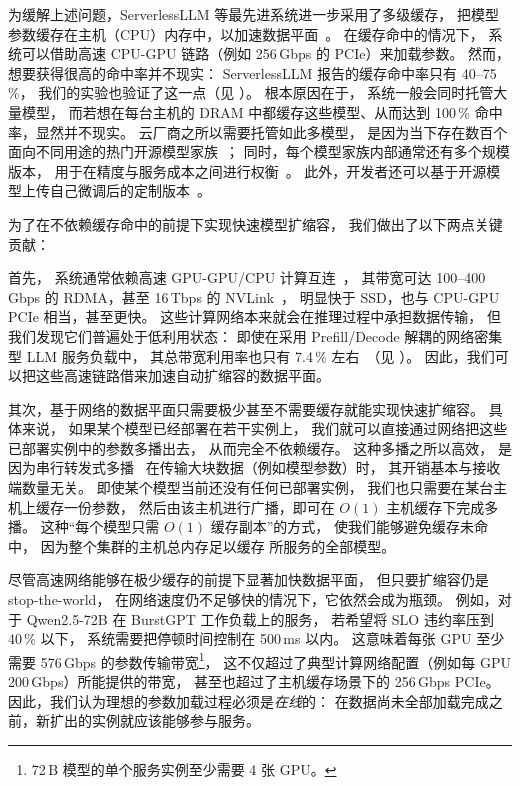 为缓解上述问题，ServerlessLLM 等最先进系统进一步采用了多级缓存，
把模型参数缓存在主机（CPU）内存中，以加速数据平面~\cite{DBLP:conf/osdi/GujaratiKAHKVM20,DBLP:conf/eurosys/JeongBA23}。
在缓存命中的情况下，
系统可以借助高速 CPU-GPU 链路（例如 256\,Gbps 的 PCIe）来加载参数。
然而，想要获得很高的命中率并不现实：
ServerlessLLM 报告的缓存命中率只有 40--75\,\%，
我们的实验也验证了这一点（见 \textsection{\ref{sec:bg-motiv}}）。
根本原因在于，{\maas} 系统一般会同时托管大量模型，
而若想在每台主机的 DRAM 中都缓存这些模型、从而达到 100\,\% 命中率，显然并不现实。
云厂商之所以需要托管如此多模型，
是因为当下存在数百个面向不同用途的热门开源模型家族~\cite{huggingface}；
同时，每个模型家族内部通常还有多个规模版本，
用于在精度与服务成本之间进行权衡~\cite{qwens}。
此外，开发者还可以基于开源模型上传自己微调后的定制版本~\cite{aws-serverless-llm}。

为了在不依赖缓存命中的前提下实现快速模型扩缩容，
我们做出了以下两点关键贡献：

首先，{\maas} 系统通常依赖高速 GPU-GPU/CPU 计算互连~\cite{nvidia-compute-network}，
其带宽可达 100--400\,Gbps 的 RDMA，甚至 16\,Tbps 的 NVLink~\cite{googleinstance,awsinstance,volcanoinstance}，
明显快于 SSD，也与 CPU-GPU PCIe 相当，甚至更快。
这些计算网络本来就会在推理过程中承担数据传输，
但我们发现它们普遍处于低利用状态：
即使在采用 Prefill/Decode 解耦的网络密集型 LLM 服务负载中，
其总带宽利用率也只有 7.4\,\% 左右~\cite{DBLP:conf/isca/PatelCZSGMB24, DBLP:conf/osdi/ZhongLCHZL0024,DBLP:journals/corr/abs-2401-11181,DBLP:conf/ppopp/CaiLMMMNS21,DBLP:journals/corr/abs-2404-09526}（见 \textsection{\ref{sec:bg-motiv}}）。
因此，我们可以把这些高速链路借来加速自动扩缩容的数据平面。

其次，基于网络的数据平面只需要极少甚至不需要缓存就能实现快速扩缩容。
具体来说，
如果某个模型已经部署在若干实例上，
我们就可以直接通过网络把这些已部署实例中的参数多播出去，
从而完全不依赖缓存。
这种多播之所以高效，
是因为串行转发式多播~\cite{DBLP:conf/icpp/VerstoepLB96}
在传输大块数据（例如模型参数）时，
其开销基本与接收端数量无关。
即使某个模型当前还没有任何已部署实例，
我们也只需要在某台主机上缓存一份参数，
然后由该主机进行广播，即可在 $O(1)$ 主机缓存下完成多播。
这种“每个模型只需 $O(1)$ 缓存副本”的方式，
使我们能够避免缓存未命中，
因为整个集群的主机总内存足以缓存 {\maas} 所服务的全部模型。

尽管高速网络能够在极少缓存的前提下显著加快数据平面，
但只要扩缩容仍是 stop-the-world，
在网络速度仍不足够快的情况下，它依然会成为瓶颈。
例如，对于 Qwen2.5-72B 在 BurstGPT 工作负载上的服务，
若希望将 SLO 违约率压到 40\,\% 以下，
系统需要把停顿时间控制在 500\,ms 以内。
这意味着每张 GPU 至少需要 576\,Gbps 的参数传输带宽\footnote{\footnotesize{72\,B 模型的单个服务实例至少需要 4 张 GPU。}}，
这不仅超过了典型计算网络配置（例如每 GPU 200\,Gbps）所能提供的带宽，
甚至也超过了主机缓存场景下的 256\,Gbps PCIe。
因此，我们认为理想的参数加载过程必须是\emph{在线}的：
在数据尚未全部加载完成之前，新扩出的实例就应该能够参与服务。

